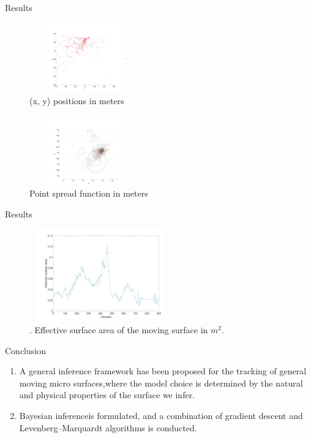 \documentclass{beamer}
\begin{document}
\begin{frame}{Results}
\begin{figure}[h]
    \centering
    \includegraphics[width=5cm, height=3cm]{Result2.jpeg}
    \caption{(x, y) positions in meters}
    \label{fig:Result2}
\end{figure}
\begin{figure}[h]
    \centering
    \includegraphics[width=5cm, height=3cm]{Result3.jpeg}
    \caption{Point spread function in meters}
    \label{fig:Result3}
\end{figure}
\end{frame}
\begin{frame}{Results}
\begin{figure}[h]
    \centering
    \includegraphics[width=6cm, height=4cm]{Result4.jpeg}
    \caption{. Effective surface area of the moving surface in $m^2$.}
    \label{fig:Result4}
\end{figure}
    
    
\end{frame}

\begin{frame}{Conclusion}
\begin{enumerate}
    \item A general inference framework has been proposed for the tracking of general moving micro surfaces,where the model choice is determined by the natural and physical properties of the surface we infer.
    
    \item Bayesian inferenceis formulated, and a combination of gradient descent and Levenberg–Marquardt algorithms is conducted.
\end{enumerate} 
\end{frame}
\end{document}
